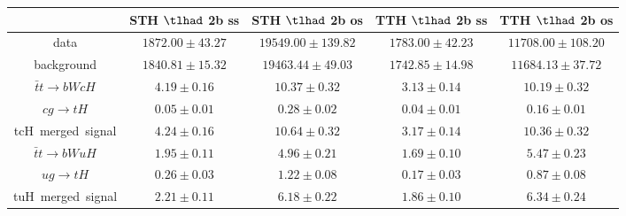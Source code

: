 \begin{tabular}{|c|c|c|c|c|} \hline
 & STH $\tlhad$ 2b ss & STH $\tlhad$ 2b os & TTH $\tlhad$ 2b ss & TTH $\tlhad$ 2b os\\\hline
data & $1872.00\pm43.27$ & $19549.00\pm139.82$ & $1783.00\pm42.23$ & $11708.00\pm108.20$\\\hline
background & $1840.81\pm15.32$ & $19463.44\pm49.03$ & $1742.85\pm14.98$ & $11684.13\pm37.72$\\\hline
$\bar{t}t\to bWcH$ & $4.19\pm0.16$ & $10.37\pm0.32$ & $3.13\pm0.14$ & $10.19\pm0.32$\\\hline
$cg\to tH$ & $0.05\pm0.01$ & $0.28\pm0.02$ & $0.04\pm0.01$ & $0.16\pm0.01$\\\hline
tcH~merged~signal & $4.24\pm0.16$ & $10.64\pm0.32$ & $3.17\pm0.14$ & $10.36\pm0.32$\\\hline
$\bar{t}t\to bWuH$ & $1.95\pm0.11$ & $4.96\pm0.21$ & $1.69\pm0.10$ & $5.47\pm0.23$\\\hline
$ug\to tH$ & $0.26\pm0.03$ & $1.22\pm0.08$ & $0.17\pm0.03$ & $0.87\pm0.08$\\\hline
tuH~merged~signal & $2.21\pm0.11$ & $6.18\pm0.22$ & $1.86\pm0.10$ & $6.34\pm0.24$\\\hline
\end{tabular}
